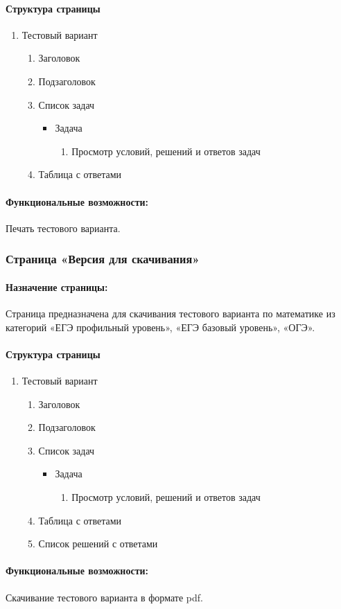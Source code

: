 \paragraph{Структура страницы}
\begin{enumerate}
	\item Тестовый вариант
	\begin{enumerate}
		\item Заголовок
		\item Подзаголовок
		\item Список задач
		\begin{itemize}
		\item Задача
		\begin{enumerate}
			\item Просмотр условий, решений и ответов задач
		\end{enumerate}
		\end{itemize}
		\item Таблица с ответами
	\end{enumerate}
\end{enumerate}

\paragraph{Функциональные возможности:} Печать тестового варианта.


\subsubsection{Страница «Версия для скачивания»}
\paragraph{Назначение страницы:} Страница предназначена для скачивания тестового варианта по математике из категорий «ЕГЭ профильный уровень», «ЕГЭ базовый уровень», «ОГЭ».

\paragraph{Структура страницы}
\begin{enumerate}
	\item Тестовый вариант
	\begin{enumerate}
		\item Заголовок
		\item Подзаголовок
		\item Список задач
		\begin{itemize}
		\item Задача
		\begin{enumerate}
			\item Просмотр условий, решений и ответов задач
		\end{enumerate}
		\end{itemize}
		\item Таблица с ответами
		\item Список решений с ответами
	\end{enumerate}
\end{enumerate}

\paragraph{Функциональные возможности:} Скачивание тестового варианта в формате pdf.
